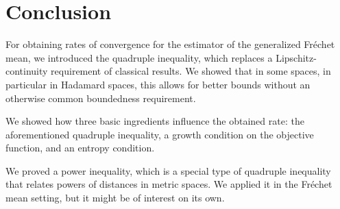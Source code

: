 \section{Conclusion}
%
For obtaining rates of convergence for the estimator of the generalized Fréchet mean, we introduced the quadruple inequality, which replaces a Lipschitz-con\-ti\-nu\-ity requirement of classical results. We showed that in some spaces, in particular in Hadamard spaces, this allows for better bounds without an otherwise common boundedness requirement.

We showed how three basic ingredients influence the obtained rate: the aforementioned quadruple inequality, a growth condition on the objective function, and an entropy condition.

We proved a power inequality, which is a special type of quadruple inequality that relates powers of distances in metric spaces. We applied it in the Fréchet mean setting, but it might be of interest on its own. 
%
%